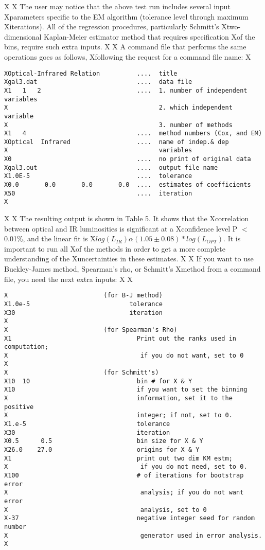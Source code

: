 X
X     The user may notice that the above test run includes several input
Xparameters specific to the EM algorithm (tolerance level through maximum 
Xiterations).  All of the regression procedures, particularly  Schmitt's
Xtwo-dimensional Kaplan-Meier estimator method that requires specification 
Xof the bins, require such extra inputs.  
X
X     A command file that performs the same operations goes as follows, 
Xfollowing the request for a command file name:
X\begin{verbatim} 
XOptical-Infrared Relation          ....  title     
Xgal3.dat                           ....  data file    
X1   1   2                          ....  1. number of independent variables
X                                         2. which independent variable
X                                         3. number of methods
X1   4                              ....  method numbers (Cox, and EM) 
XOptical  Infrared                  ....  name of indep.& dep
X                                         variables
X0                                  ....  no print of original data
Xgal3.out                           ....  output file name 
X1.0E-5                             ....  tolerance  
X0.0       0.0       0.0       0.0  ....  estimates of coefficients
X50                                 ....  iteration  
X\end{verbatim} 
X
X     The resulting output is shown in Table 5. It shows that the
Xcorrelation between optical and IR luminosities is significant at a
Xconfidence level P $<$ 0.01\%, and the linear fit  is 
X$log(L_{IR})\alpha(1.05 \pm 0.08)*log(L_{OPT})$. It is important to run all 
Xof the methods in order to get a more complete understanding of the 
Xuncertainties in these estimates.
X
X      If you want to use Buckley-James method, Spearman's rho, or Schmitt's 
Xmethod from a command file, you need the next extra inputs:
X
X\begin{verbatim}
X                          (for B-J method)
X1.0e-5                           tolerance
X30                               iteration
X
X                          (for Spearman's Rho)
X1                                  Print out the ranks used in computation;
X                                    if you do not want, set to 0  
X
X                          (for Schmitt's)
X10  10                             bin # for X & Y
X10                                 if you want to set the binning
X                                   information, set it to the positive
X                                   integer; if not, set to 0.
X1.e-5                              tolerance
X30                                 iteration
X0.5      0.5                       bin size for X & Y
X26.0    27.0                       origins for X & Y
X1                                  print out two dim KM estm;
X                                    if you do not need, set to 0.
X100                                # of iterations for bootstrap error 
X                                    analysis; if you do not want error 
X                                    analysis, set to 0
X-37                                negative integer seed for random number
X                                    generator used in error analysis.
X\end{verbatim}
